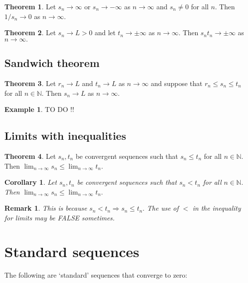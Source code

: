 \documentclass[12pt, a4paper]{article}
\newcommand{\bb}[1]{\mathbb{#1}}
\newcommand{\imply}{\Rightarrow}
\newtheorem*{remark}{Remark}
\theoremstyle{definition}
\newtheorem{theorem}{Theorem}[section]
\newtheorem*{example}{Example}
\theoremstyle{plain}
\newtheorem{corollary}{Corollary}[theorem]
\begin{document}
\begin{theorem}
Let $s_n \to \infty$ or $s_n \to -\infty$ as $n \to \infty$ and $s_n \neq  0$ for all $n$. Then $1/{s_n} \to 0$ as $n \to \infty.$
\end{theorem}

\begin{theorem}
Let $s_n \to L>0$ and let $t_n \to \pm\infty$ as $n\to\infty.$ Then $s_nt_n \to \pm\infty$ as $n\to \infty.$
\end{theorem}

\subsection{Sandwich theorem}

\begin{theorem}
Let $r_n \to L$ and $t_n \to L$ as $n \to \infty$ and suppose that $r_n \leq s_n \leq t_n$ for all $n\in\bb{N}.$ Then $s_n \to L$ as $n\to \infty.$
\end{theorem}	

\begin{example}
TO DO !!
\end{example}

\subsection{Limits with inequalities}

\begin{theorem}
Let $s_n, t_n$ be convergent sequences such that $s_n \leq t_n$ for all $n \in \bb{N}.$ Then $\lim_{n\to \infty}s_n \leq \lim_{n\to \infty} t_n.$
\end{theorem}

\begin{corollary}
Let $s_n, t_n$ be convergent sequences such that $s_n < t_n$ for all $n \in \bb{N}.$ Then $\lim_{n\to \infty}s_n \leq \lim_{n\to \infty} t_n.$
\end{corollary}

\begin{remark}
This is because $s_n<t_n \imply s_n\leq t_n.$ The use of $<$ in the inequality for limits may be FALSE sometimes. 
\end{remark}

\section{Standard sequences}

The following are `standard' sequences that converge to zero:
\end{document}
